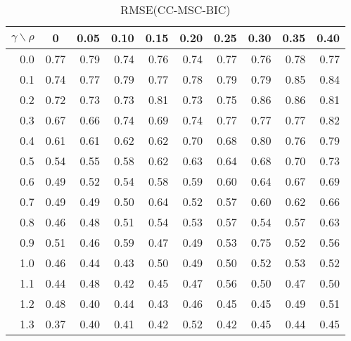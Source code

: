 \documentclass[12pt]{article}
\begin{document}
%
\begin{table}[!tbp]
\caption{RMSE(CC-MSC-BIC)}
 \begin{center}
 \begin{tabular}{r|rrrrrrrrr}\hline\hline
\multicolumn{1}{c|}{$\gamma\backslash\rho$}&\multicolumn{1}{c}{0}&\multicolumn{1}{c}{0.05}&\multicolumn{1}{c}{0.10}&\multicolumn{1}{c}{0.15}&\multicolumn{1}{c}{0.20}&\multicolumn{1}{c}{0.25}&\multicolumn{1}{c}{0.30}&\multicolumn{1}{c}{0.35}&\multicolumn{1}{c}{0.40}\tabularnewline
\hline

0.0&0.77&0.79&0.74&0.76&0.74&0.77&0.76&0.78&0.77\tabularnewline
0.1&0.74&0.77&0.79&0.77&0.78&0.79&0.79&0.85&0.84\tabularnewline
0.2&0.72&0.73&0.73&0.81&0.73&0.75&0.86&0.86&0.81\tabularnewline
0.3&0.67&0.66&0.74&0.69&0.74&0.77&0.77&0.77&0.82\tabularnewline
0.4&0.61&0.61&0.62&0.62&0.70&0.68&0.80&0.76&0.79\tabularnewline
0.5&0.54&0.55&0.58&0.62&0.63&0.64&0.68&0.70&0.73\tabularnewline
0.6&0.49&0.52&0.54&0.58&0.59&0.60&0.64&0.67&0.69\tabularnewline
0.7&0.49&0.49&0.50&0.64&0.52&0.57&0.60&0.62&0.66\tabularnewline
0.8&0.46&0.48&0.51&0.54&0.53&0.57&0.54&0.57&0.63\tabularnewline
0.9&0.51&0.46&0.59&0.47&0.49&0.53&0.75&0.52&0.56\tabularnewline
1.0&0.46&0.44&0.43&0.50&0.49&0.50&0.52&0.53&0.52\tabularnewline
1.1&0.44&0.48&0.42&0.45&0.47&0.56&0.50&0.47&0.50\tabularnewline
1.2&0.48&0.40&0.44&0.43&0.46&0.45&0.45&0.49&0.51\tabularnewline
1.3&0.37&0.40&0.41&0.42&0.52&0.42&0.45&0.44&0.45\tabularnewline
\hline
\end{tabular}

\end{center}

\end{table}
\end{document}
